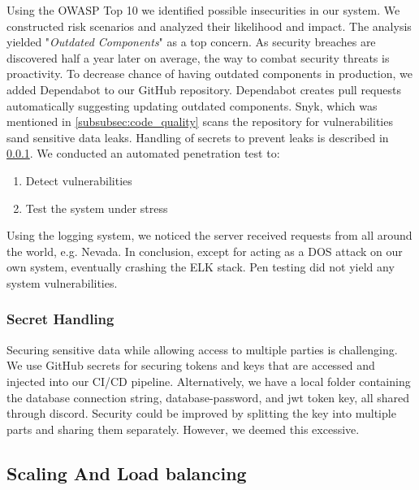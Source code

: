 Using the OWASP Top 10\cite{owasp} we identified possible insecurities in our system. We constructed risk scenarios and analyzed their likelihood and impact. 
The analysis yielded "\textit{Outdated Components}" as a top concern. As security breaches are discovered half a year later on average, the way to combat security threats is proactivity\cite{securitylecture}. To decrease chance of having outdated components in production, we added Dependabot to our GitHub repository. Dependabot creates pull requests automatically suggesting updating outdated components. Snyk, which was mentioned in \ref{subsubsec:code_quality} scans the repository for vulnerabilities sand sensitive data leaks. Handling of secrets to prevent leaks is described in \ref{subsubsec:secrets}.
We conducted an automated penetration test to:
\begin{enumerate}
    \item Detect vulnerabilities
    \item Test the system under stress
\end{enumerate}
Using the logging system, we noticed the server received requests from all around the world, e.g. Nevada. In conclusion, except for acting as a DOS attack on our own system, eventually crashing the ELK stack. Pen testing did not yield any system vulnerabilities.

\subsubsection{Secret Handling}
\label{subsubsec:secrets}
Securing sensitive data while allowing access to multiple parties is challenging. We use GitHub secrets for securing tokens and keys that are accessed and injected into our CI/CD pipeline. Alternatively, we have a local folder containing the database connection string, database-password, and jwt token key, all shared through discord. Security could be improved by splitting the key into multiple parts and sharing them separately. However, we deemed this excessive.
\clearpage
\subsection{Scaling And Load balancing}
\label{subsec:scaling}

